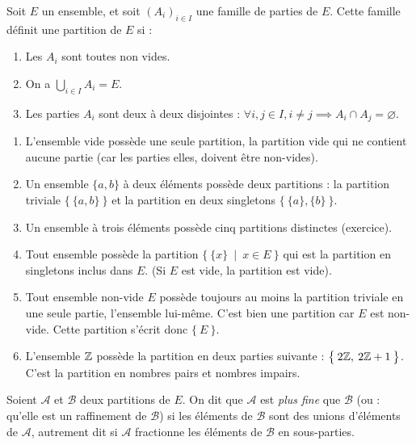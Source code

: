 \begin{exemple}
Soit $E$ un ensemble, et soit $(A_i)_{i\in I}$ une famille de parties de $E$. Cette famille définit une partition de $E$ si :
\begin{enumerate}
\item Les $A_i$ sont toutes non vides.
\item On a $\bigcup_{i\in I} A_i = E$.
\item Les parties $A_i$ sont deux à deux disjointes : $\forall i, j\in I, i\neq j \implies A_i\cap A_j=\varnothing$.
\end{enumerate}
\end{exemple}

\begin{exemple}
\begin{enumerate}
\item L'ensemble vide possède une seule partition, la partition vide qui ne contient aucune partie (car les parties elles, doivent être non-vides).
\item Un ensemble $\{a,b\}$ à deux éléments possède deux partitions : la partition triviale $\big\{\: \{a,b\} \:\big\}$ et la partition en deux singletons $\big\{\: \{a\},\{b\} \:\big\}$.
\item Un ensemble à trois éléments possède cinq partitions distinctes (exercice).
\item Tout ensemble possède la partition $\big\{\: \{x\}\:\mid\: x\in E \:\big\}$ qui est la partition en singletons inclus dans $E$. (Si $E$ est vide, la partition est vide).
\item Tout ensemble non-vide $E$ possède toujours au moins la partition triviale en une seule partie, l'ensemble lui-même. C'est bien une partition car $E$ est non-vide. Cette partition s'écrit donc $\big\{\: E \:\big\}$.
\item L'ensemble $\mathbb{Z}$ possède la partition en deux parties suivante : $\big\{\: 2\mathbb{Z}, \: 2\mathbb{Z}+1\:\big\}$. C'est la partition en nombres pairs et nombres impairs.
\end{enumerate}
\end{exemple}

\begin{definition}
Soient $\mathcal A$ et $\mathcal B$ deux partitions de $E$. On dit que $\mathcal A$ est \emph{plus fine} que $\mathcal B$ (ou : qu'elle est un raffinement de $\mathcal B$) si les éléments de $\mathcal B$ sont des unions d'éléments de $\mathcal A$, autrement dit si $\mathcal A$ fractionne les éléments de $\mathcal B$ en sous-parties.
\end{definition}

